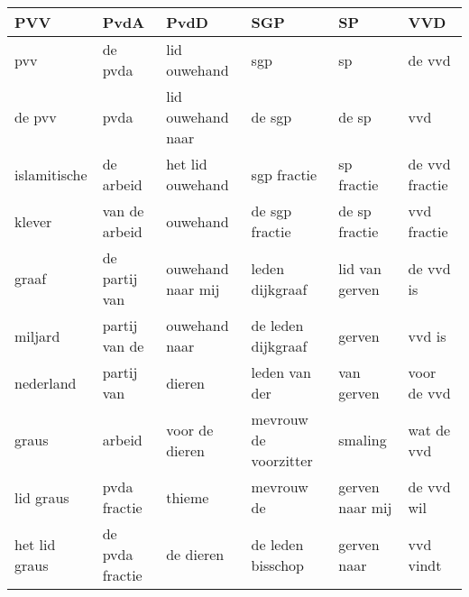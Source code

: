 \begin{tabular}{llllll}
\toprule
           PVV &             PvdA &               PvdD &                    SGP &               SP &             VVD \\
\midrule
           pvv &          de pvda &       lid ouwehand &                    sgp &               sp &          de vvd \\
        de pvv &             pvda &  lid ouwehand naar &                 de sgp &            de sp &             vvd \\
  islamitische &        de arbeid &   het lid ouwehand &            sgp fractie &       sp fractie &  de vvd fractie \\
        klever &    van de arbeid &           ouwehand &         de sgp fractie &    de sp fractie &     vvd fractie \\
         graaf &    de partij van &  ouwehand naar mij &        leden dijkgraaf &   lid van gerven &       de vvd is \\
       miljard &    partij van de &      ouwehand naar &     de leden dijkgraaf &           gerven &          vvd is \\
     nederland &       partij van &             dieren &          leden van der &       van gerven &     voor de vvd \\
         graus &           arbeid &     voor de dieren &  mevrouw de voorzitter &          smaling &      wat de vvd \\
     lid graus &     pvda fractie &             thieme &             mevrouw de &  gerven naar mij &      de vvd wil \\
 het lid graus &  de pvda fractie &          de dieren &      de leden bisschop &      gerven naar &       vvd vindt \\
\bottomrule
\end{tabular}
